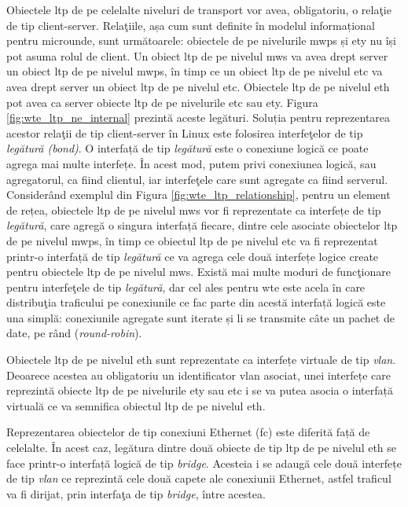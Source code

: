 Obiectele \gls{ltp} de pe celelalte niveluri de transport vor avea, obligatoriu, o relaţie de tip client-server. Relaţiile, așa cum sunt definite în modelul informațional pentru microunde, sunt următoarele: obiectele de pe nivelurile \gls{mwps} și \gls{ety} nu își pot asuma rolul de client. Un obiect \gls{ltp} de pe nivelul \gls{mws} va avea drept server un obiect \gls{ltp} de pe nivelul \gls{mwps}, în timp ce un obiect \gls{ltp} de pe nivelul \gls{etc} va avea drept server un obiect \gls{ltp} de pe nivelul \gls{etc}. Obiectele \gls{ltp} de pe nivelul \gls{eth} pot avea ca server obiecte \gls{ltp} de pe nivelurile \gls{etc} sau \gls{ety}. Figura \ref{fig:wte_ltp_ne_internal} prezintă aceste legături. Soluția pentru reprezentarea acestor relaţii de tip client-server în Linux este folosirea interfeţelor de tip \textit{legătură (bond)}. O interfață de tip \textit{legătură} este o conexiune logică ce poate agrega mai multe interfețe. În acest mod, putem privi conexiunea logică, sau agregatorul, ca fiind clientul, iar interfeţele care sunt agregate ca fiind serverul. Considerând exemplul din Figura \ref{fig:wte_ltp_relationship}, pentru un element de rețea, obiectele \gls{ltp} de pe nivelul \gls{mws} vor fi reprezentate ca interfețe de tip \textit{legătură}, care agregă o singura interfață fiecare, dintre cele asociate obiectelor \gls{ltp} de pe nivelul \gls{mwps}, în timp ce obiectul \gls{ltp} de pe nivelul \gls{etc} va fi reprezentat printr-o interfață de tip \textit{legătură} ce va agrega cele două interfețe logice create pentru obiectele \gls{ltp} de pe nivelul \gls{mws}. Există mai multe moduri de funcţionare pentru interfeţele de tip \textit{legătură}, dar cel ales pentru \gls{wte} este acela în care distribuţia traficului pe conexiunile ce fac parte din acestă interfață logică este una simplă: conexiunile agregate sunt iterate și li se transmite câte un pachet de date, pe rând (\textit{round-robin}).

Obiectele \gls{ltp} de pe nivelul \gls{eth} sunt reprezentate ca interfețe virtuale de tip \textit{vlan}. Deoarece acestea au obligatoriu un identificator \gls{vlan} asociat, unei interfețe care reprezintă obiecte \gls{ltp} de pe nivelurile \gls{ety} sau \gls{etc} i se va putea asocia o interfață virtuală ce va semnifica obiectul \gls{ltp} de pe nivelul \gls{eth}.

Reprezentarea obiectelor de tip conexiuni Ethernet (\gls{fc}) este diferită față de celelalte. În acest caz, legătura dintre două obiecte de tip \gls{ltp} de pe nivelul \gls{eth} se face printr-o interfață logică de tip \textit{bridge}. Acesteia i se adaugă cele două interfețe de tip \textit{vlan} ce reprezintă cele două capete ale conexiunii Ethernet, astfel traficul va fi dirijat, prin interfaţa de tip \textit{bridge}, între acestea.

